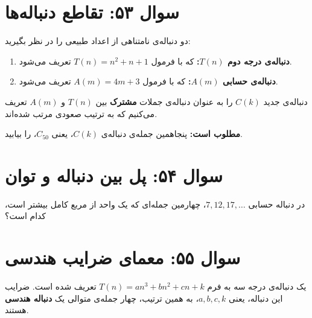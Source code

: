 \documentclass[12pt]{article}
\begin{document}
	\section*{سوال ۵۳: تقاطع دنباله‌ها}
	دو دنباله‌ی نامتناهی از اعداد طبیعی را در نظر بگیرید:
	\begin{enumerate}[label=(\roman*)]
		\item \textbf{دنباله‌ی درجه دوم \(T(n)\):} که با فرمول \( T(n) = n^2 + n + 1 \) تعریف می‌شود.
		\item \textbf{دنباله‌ی حسابی \(A(m)\):} که با فرمول \( A(m) = 4m + 3 \) تعریف می‌شود.
	\end{enumerate}
	\vspace{0.5cm}
	
	دنباله‌ی جدید \(C(k)\) را به عنوان دنباله‌ی جملات \textbf{مشترک} بین \(T(n)\) و \(A(m)\) تعریف می‌کنیم که به ترتیب صعودی مرتب شده‌اند.
	\vspace{0.5cm}
	
	\textbf{مطلوب است:} پنجاهمین جمله‌ی دنباله‌ی \(C(k)\)، یعنی \(C_{50}\)، را بیابید.
	
	\vspace{1cm}
	\hrulefill
	\vspace{1cm}
	
	\section*{سوال ۵۴: پل بین دنباله و توان}
	در دنباله حسابی \( 7, 12, 17, \dots \)، چهارمین جمله‌ای که یک واحد از مربع کامل بیشتر است، کدام است؟
	
	\vspace{1cm}
	\hrulefill
	\vspace{1cm}
	
	\section*{سوال ۵۵: معمای ضرایب هندسی}
	یک دنباله‌ی درجه سه به فرم \( T(n) = an^3 + bn^2 + cn + k \) تعریف شده است.
	ضرایب این دنباله، یعنی \(a, b, c, k\)، به همین ترتیب، چهار جمله‌ی متوالی یک \textbf{دنباله هندسی} هستند.
	\vspace{0.5cm}
	
\end{document}
